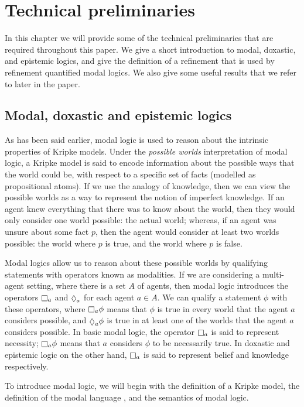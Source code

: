 \chapter{Technical preliminaries}

In this chapter we will provide some of the technical preliminaries that are
required throughout this paper. We give a short introduction to modal, doxastic,
and epistemic logics, and give the definition of a refinement that is used by
refinement quantified modal logics. We also give some useful results that we
refer to later in the paper.

\section{Modal, doxastic and epistemic logics}

As has been said earlier, modal logic is used to reason about the intrinsic
properties of Kripke models. Under the {\em possible worlds} interpretation of
modal logic, a Kripke model is said to encode information about the possible
ways that the world could be, with respect to a specific set of facts (modelled
as propositional atoms). If we use the analogy of knowledge, then we can view
the possible worlds as a way to represent the notion of imperfect knowledge. If
an agent knew everything that there was to know about the world, then they
would only consider one world possible: the actual world; whereas, if an agent
was unsure about some fact $p$, then the agent would consider at least two
worlds possible: the world where $p$ is true, and the world where $p$ is false.

Modal logics allow us to reason about these possible worlds by qualifying
statements with operators known as modalities. If we are considering a
multi-agent setting, where there is a set $A$ of agents, then modal logic
introduces the operators $\knows_a$ and $\suspects_a$ for each agent $a \in A$.
We can qualify a statement $\phi$ with these operators, where $\knows_a \phi$
means that $\phi$ is true in every world that the agent $a$ considers possible,
and $\suspects_a \phi$ is true in at least one of the worlds that the agent $a$
considers possible. In basic modal logic, the operator $\knows_a$ is said to
represent necessity; $\knows_a \phi$ means that $a$ considers $\phi$ to be
necessarily true. In doxastic and epistemic logic on the other hand, $\knows_a$
is said to represent belief and knowledge respectively.

To introduce modal logic, we will begin with the definition of a Kripke model,
the definition of the modal language \lang{}, and the semantics of modal logic.

